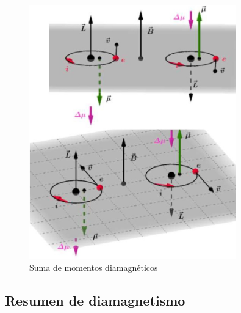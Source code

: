 \begin{figure}[H]
    \centering
    \includegraphics[width=0.8\textwidth]{./Figures/fig_s18}
	\caption{Suma de momentos diamagnéticos}
	\label{fig:s18}
\end{figure}

\subsection{Resumen de diamagnetismo}

